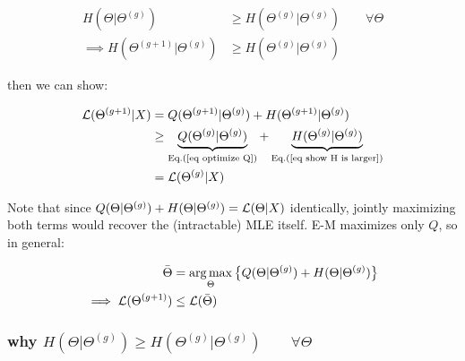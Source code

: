 \documentclass{article}
\def\L{{\cal L}}
\begin{document}
\begin{equation}\begin{split}\label{eq show H is larger}
H(\Theta | \Theta^{(g)}) &\ge H(\Theta^{(g)} | \Theta^{(g)})\quad\quad \forall \Theta\\
\implies H(\Theta^{(g+1)} | \Theta^{(g)}) &\ge H(\Theta^{(g)} | \Theta^{(g)})
\end{split}\end{equation}

then we can show:

\begin{equation}\begin{split}
\L(\Theta^{(g+1)}|X) &= Q (\Theta^{(g+1)} | \Theta^{(g)}) + H (\Theta^{(g+1)} | \Theta^{(g)})\\
& \ge \underbrace{Q (\Theta^{(g)} | \Theta^{(g)})}_{\text{Eq.(\ref{eq optimize Q})}} + \underbrace{H (\Theta^{(g)} | \Theta^{(g)})}_{\text{Eq.(\ref{eq show H is larger})}}\\
& = \L(\Theta^{(g)}|X)\\
\end{split}\end{equation}


Note that since $Q (\Theta | \Theta^{(g)}) + H (\Theta | \Theta^{(g)}) = \L(\Theta|X)$ identically, jointly maximizing both terms would recover the (intractable) MLE itself. E-M maximizes only $Q$, so in general:

\begin{equation}\begin{split}
\bar{\Theta} &= \argmax_{\Theta} \big\{ Q (\Theta | \Theta^{(g)}) + H (\Theta | \Theta^{(g)}) \big\}\\
\implies \L(\Theta^{(g+1)}) &\le \L(\bar{\Theta}) \\
\end{split}\end{equation}


\subsubsection{why $H(\Theta | \Theta^{(g)}) \ge  H(\Theta^{(g)} | \Theta^{(g)})\quad\quad \forall \Theta$}
\end{document}
